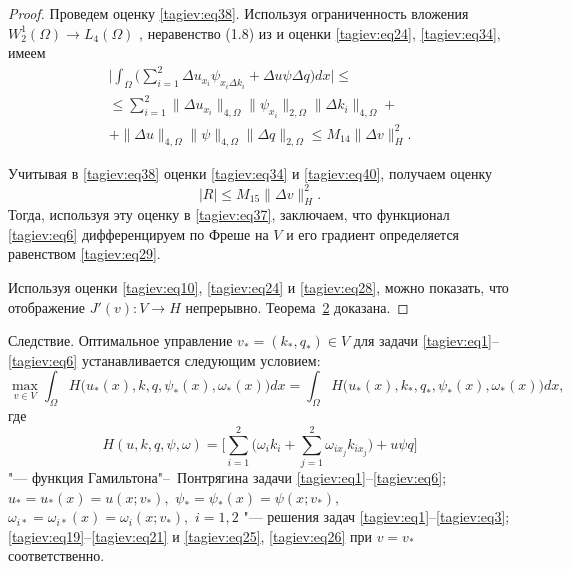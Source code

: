 \begin{proof}
Проведем оценку \eqref{tagiev:eq38}. Используя ограниченность вложения $W_2^1 ( 
\Omega )\to L_4 ( \Omega )$ \cite[c.~84]{tagiev:bib15}, неравенство (1.8) 
из \cite[c.~67]{tagiev:bib17} и оценки \eqref{tagiev:eq24}, \eqref{tagiev:eq34}, имеем
\begin{multline}
\label{tagiev:eq40}
\biggl | \int _\Omega \biggl(\sum\limits_{i=1}^2 \Delta u_{x_i } \psi 
_{x_i \Delta k_i} +\Delta u\psi \Delta q \biggr)dx \biggr| \le \\
\le
\sum\limits_{i=1}^2  \| \Delta u_{x_i }  \|_{4,\Omega}  
 \|\psi _{x_i } \|_{2,\Omega } \| \Delta k_i  \|_{4,\Omega } + \\ 
 + \| \Delta u \|_{4,\Omega } \| \psi \|_{4,\Omega 
} \| \Delta q \|_{2, \Omega } \le M_{14} \| \Delta  v  \|_H^2.
\end{multline}

Учитывая в \eqref{tagiev:eq38} оценки \eqref{tagiev:eq34} и \eqref{tagiev:eq40}, получаем оценку 
$$| R |\le M_{15} \| \Delta  v  \|_H^2.$$
Тогда, используя эту оценку в \eqref{tagiev:eq37}, заключаем, что функционал \eqref{tagiev:eq6} 
дифференцируем по Фреше на $V$ и его градиент определяется равенством \eqref{tagiev:eq29}. 

Используя оценки \eqref{tagiev:eq10}, \eqref{tagiev:eq24} и \eqref{tagiev:eq28}, можно показать, что отображение 
$J' ( v ): V\to H$ непрерывно. Теорема~\hyperlink{tag:th2}{2} доказана.
\end{proof}

\smallskip


{\small \sc Следствие.} 
Оптимальное управление ${v_* = (k_*, q_*)\in V}$ для задачи \eqref{tagiev:eq1}--\eqref{tagiev:eq6} устанавливается следующим условием:
$$
\max_{v \in V} \int _\Omega  H \bigl( u_* (x), k , q, \psi _\ast ( x ), \omega_* (x) \bigr) dx =
\int _\Omega  H \bigl( u_* (x), k_* , q_*, \psi _\ast ( x ), \omega_* (x) \bigr) dx,
$$
где 
$$
 H ( u , k , q, \psi , \omega) =
 \biggl[\sum\limits_{i=1}^2 \biggl(\omega _{i} k_i + \sum\limits_{j=1}^2 \omega_{i x_j } k_{ix_j }  \biggr)+
u \psi q \biggr]
$$
"--- функция Гамильтона"--~Понтрягина задачи \eqref{tagiev:eq1}--\eqref{tagiev:eq6}; 
$u_\ast =u_\ast ( x )=u ( x; v  _\ast ),$ 
$\psi _\ast =\psi _\ast ( x )=\psi (x; v  _\ast ),$ 
$\omega _{i\ast } =\omega _{i\ast } ( x )=\omega _i (x; v  _\ast ),$
$i=1,2$ "--- решения задач \rm \eqref{tagiev:eq1}--\eqref{tagiev:eq3}; \eqref{tagiev:eq19}--\eqref{tagiev:eq21} и \eqref{tagiev:eq25},   \eqref{tagiev:eq26} при $ v  = v  _\ast $ соответственно.

\smallskip



